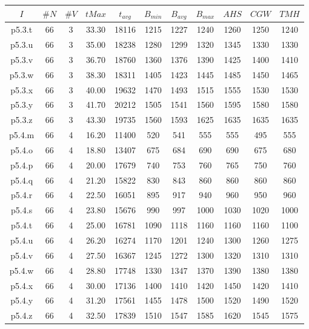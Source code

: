 \begin{center}
\begin{tabular}{ |c|c|c|c|c|c|c|c|c|c|c| } 
\hline
$I$ & $\#N$ & $\#V$ & $tMax$ & $t_{avg}$ & $B_{min}$ & $B_{avg}$ & $B_{max}$ & $AHS$ & $CGW$ & $TMH$\\
\hline
p5.3.t & 66 & 3 & 33.30 & 18116 & 1215 & 1227 & 1240 & 1260 & 1250 & 1240  \\
p5.3.u & 66 & 3 & 35.00 & 18238 & 1280 & 1299 & 1320 & 1345 & 1330 & 1330  \\
p5.3.v & 66 & 3 & 36.70 & 18760 & 1360 & 1376 & 1390 & 1425 & 1400 & 1410  \\
p5.3.w & 66 & 3 & 38.30 & 18311 & 1405 & 1423 & 1445 & 1485 & 1450 & 1465  \\
p5.3.x & 66 & 3 & 40.00 & 19632 & 1470 & 1493 & 1515 & 1555 & 1530 & 1530  \\
p5.3.y & 66 & 3 & 41.70 & 20212 & 1505 & 1541 & 1560 & 1595 & 1580 & 1580  \\
p5.3.z & 66 & 3 & 43.30 & 19735 & 1560 & 1593 & 1625 & 1635 & 1635 & 1635  \\
p5.4.m & 66 & 4 & 16.20 & 11400 & 520 & 541 & 555 & 555 & 495 & 555  \\
p5.4.o & 66 & 4 & 18.80 & 13407 & 675 & 684 & 690 & 690 & 675 & 680  \\
p5.4.p & 66 & 4 & 20.00 & 17679 & 740 & 753 & 760 & 765 & 750 & 760  \\
p5.4.q & 66 & 4 & 21.20 & 15822 & 830 & 843 & 860 & 860 & 860 & 860  \\
p5.4.r & 66 & 4 & 22.50 & 16051 & 895 & 917 & 940 & 960 & 950 & 960  \\
p5.4.s & 66 & 4 & 23.80 & 15676 & 990 & 997 & 1000 & 1030 & 1020 & 1000  \\
p5.4.t & 66 & 4 & 25.00 & 16781 & 1090 & 1118 & 1160 & 1160 & 1160 & 1100  \\
p5.4.u & 66 & 4 & 26.20 & 16274 & 1170 & 1201 & 1240 & 1300 & 1260 & 1275  \\
p5.4.v & 66 & 4 & 27.50 & 16367 & 1245 & 1272 & 1300 & 1320 & 1310 & 1310  \\
p5.4.w & 66 & 4 & 28.80 & 17748 & 1330 & 1347 & 1370 & 1390 & 1380 & 1380  \\
p5.4.x & 66 & 4 & 30.00 & 17136 & 1400 & 1410 & 1420 & 1450 & 1420 & 1410  \\
p5.4.y & 66 & 4 & 31.20 & 17561 & 1455 & 1478 & 1500 & 1520 & 1490 & 1520  \\
p5.4.z & 66 & 4 & 32.50 & 17839 & 1510 & 1547 & 1585 & 1620 & 1545 & 1575  \\

\end{tabular}
\end{center}
